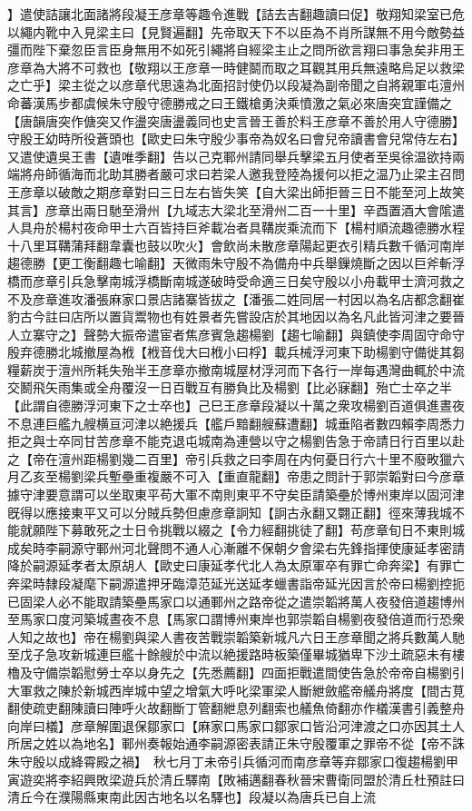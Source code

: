 】遣使詰讓北面諸將段凝王彦章等趣令進戰【詰去吉翻趣讀曰促】敬翔知梁室已危以繩内靴中入見梁主曰【見賢遍翻】先帝取天下不以臣為不肖所謀無不用今敵勢益彊而陛下棄忽臣言臣身無用不如死引繩將自經梁主止之問所欲言翔曰事急矣非用王彦章為大將不可救也【敬翔以王彦章一時健鬬而取之耳觀其用兵無遠略烏足以救梁之亡乎】梁主從之以彦章代思遠為北面招討使仍以段凝為副帝聞之自將親軍屯澶州命蕃漢馬步都虞候朱守殷守德勝戒之曰王鐵槍勇決乘憤激之氣必來唐突宜謹備之【唐韻唐突作傏突又作盪突唐盪義同也史言晉王善於料王彦章不善於用人守德勝】守殷王幼時所役蒼頭也【歐史曰朱守殷少事帝為奴名曰會兒帝讀書會兒常侍左右】又遣使遺吳王書【遺唯季翻】告以己克鄆州請同舉兵擊梁五月使者至吳徐温欲持兩端將舟師循海而北助其勝者嚴可求曰若梁人邀我登陸為援何以拒之温乃止梁主召問王彦章以破敵之期彦章對曰三日左右皆失笑【自大梁出師拒晉三日不能至河上故笑其言】彦章出兩日馳至滑州【九域志大梁北至滑州二百一十里】辛酉置酒大會隂遣人具舟於楊村夜命甲士六百皆持巨斧載冶者具鞲炭乘流而下【楊村順流趣德勝水程十八里耳鞲蒲拜翻韋囊也鼓以吹火】會飲尚未散彦章陽起更衣引精兵數千循河南岸趨德勝【更工衡翻趣七喻翻】天微雨朱守殷不為備舟中兵舉鏁燒斷之因以巨斧斬浮橋而彦章引兵急擊南城浮橋斷南城遂破時受命適三日矣守殷以小舟載甲士濟河救之不及彦章進攻潘張麻家口景店諸寨皆拔之【潘張二姓同居一村因以為名店都念翻崔豹古今註曰店所以置貨鬻物也有姓景者先嘗設店於其地因以為名凡此皆河津之要晉人立寨守之】聲勢大振帝遣宦者焦彦賓急趨楊劉【趨七喻翻】與鎮使李周固守命守殷弃德勝北城撤屋為栰【栰音伐大曰栰小曰桴】載兵械浮河東下助楊劉守備徙其芻糧薪炭于澶州所耗失殆半王彦章亦撤南城屋材浮河而下各行一岸每遇灣曲輒於中流交鬭飛矢雨集或全舟覆沒一日百戰互有勝負比及楊劉【比必寐翻】殆亡士卒之半【此謂自德勝浮河東下之士卒也】己巳王彦章段凝以十萬之衆攻楊劉百道俱進晝夜不息連巨艦九艘横亘河津以絶援兵【艦戶黯翻艘蘇遭翻】城垂陷者數四賴李周悉力拒之與士卒同甘苦彦章不能克退屯城南為連營以守之楊劉告急于帝請日行百里以赴之【帝在澶州距楊劉幾二百里】帝引兵救之曰李周在内何憂日行六十里不廢畋獵六月乙亥至楊劉梁兵塹壘重複嚴不可入【重直龍翻】帝患之問計于郭崇韜對曰今彦章據守津要意謂可以坐取東平苟大軍不南則東平不守矣臣請築壘於博州東岸以固河津旣得以應接東平又可以分賊兵勢但慮彦章詗知【詗古永翻又翾正翻】徑來薄我城不能就願陛下募敢死之士日令挑戰以綴之【令力經翻挑徒了翻】苟彦章旬日不東則城成矣時李嗣源守鄆州河北聲問不通人心漸離不保朝夕會梁右先鋒指揮使康延孝密請降於嗣源延孝者太原胡人【歐史曰康延孝代北人為太原軍卒有罪亡命奔梁】有罪亡奔梁時隸段凝麾下嗣源遣押牙臨漳范延光送延孝蠟書詣帝延光因言於帝曰楊劉控扼已固梁人必不能取請築壘馬家口以通鄆州之路帝從之遣崇韜將萬人夜發倍道趨博州至馬家口度河築城晝夜不息【馬家口謂博州東岸也郭崇韜自楊劉夜發倍道而行恐衆人知之故也】帝在楊劉與梁人書夜苦戰崇韜築新城凡六日王彦章聞之將兵數萬人馳至戊子急攻新城連巨艦十餘艘於中流以絶援路時板築僅畢城猶卑下沙土疏惡未有樓櫓及守備崇韜慰勞士卒以身先之【先悉薦翻】四面拒戰遣間使告急於帝帝自楊劉引大軍救之陳於新城西岸城中望之增氣大呼叱梁軍梁人斷紲斂艦帝艤舟將度【間古莧翻使疏吏翻陳讀曰陣呼火故翻斷丁管翻紲息列翻索也艤魚倚翻亦作檥漢書引義整舟向岸曰檥】彦章解圍退保鄒家口【麻家口馬家口鄒家口皆沿河津渡之口亦因其土人所居之姓以為地名】鄆州奏報始通李嗣源密表請正朱守殷覆軍之罪帝不從【帝不誅朱守殷以成絳霄殿之禍】　秋七月丁未帝引兵循河而南彦章等弃鄒家口復趨楊劉甲寅遊奕將李紹興敗梁遊兵於清丘驛南【敗補邁翻春秋晉宋曹衛同盟於清丘杜預註曰清丘今在濮陽縣東南此因古地名以名驛也】段凝以為唐兵已自上流
